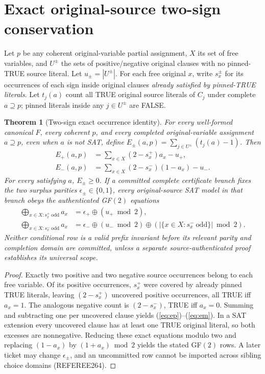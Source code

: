 \documentclass[11pt]{article}
\newtheorem{theorem}{Theorem}
\begin{document}
\section{Exact original-source two-sign conservation}
Let $p$ be any coherent original-variable partial assignment, $X$ its set of free variables, and $U^\pm$ the sets of positive/negative original clauses with no pinned-TRUE source literal. Let $u_\pm=|U^\pm|$. For each free original $x$, write $s_x^\pm$ for its occurrences of each sign inside original clauses \emph{already satisfied by pinned-TRUE literals}. Let $t_j(a)$ count all TRUE original source literals of $C_j$ under complete $a\supseteq p$; pinned literals inside any $j\in U^\pm$ are FALSE.
\begin{theorem}[Two-sign exact occurrence identity]\label{thm:split}
For every well-formed canonical $F$, every coherent $p$, and \emph{every} completed original-variable assignment $a\supseteq p$, even when $a$ is not SAT, define $E_\pm(a,p)=\sum_{j\in U^\pm}(t_j(a)-1)$. Then
\begin{align}
E_+(a,p)&=\sum_{x\in X}(2-s_x^+)a_x-u_+,\label{eq:ep}\\
E_-(a,p)&=\sum_{x\in X}(2-s_x^-)(1-a_x)-u_- .\label{eq:em}
\end{align}
For every satisfying $a$, $E_\pm\ge0$. If a \emph{committed} complete certificate branch fixes the two surplus parities $\epsilon_\pm\in\{0,1\}$, every original-source SAT model in that branch obeys the authenticated GF$(2)$ equations
\begin{align}
\bigoplus_{x\in X:s_x^+\ \mathrm{odd}}a_x&=\epsilon_+\oplus(u_+\bmod2),\\
\bigoplus_{x\in X:s_x^-\ \mathrm{odd}}a_x&=\epsilon_-\oplus(u_-\bmod2)\oplus(|\{x\in X:s_x^-\ \mathrm{odd}\}|\bmod2).
\end{align}
Neither conditional row is a valid prefix invariant before its relevant parity and completion domain are committed, unless a separate source-authenticated proof establishes its universal scope.
\end{theorem}
\begin{proof}
Exactly two positive and two negative source occurrences belong to each free variable. Of its positive occurrences, $s_x^+$ were covered by already pinned TRUE literals, leaving $(2-s_x^+)$ uncovered positive occurrences, all TRUE iff $a_x=1$. The analogous negative count is $(2-s_x^-)$, TRUE iff $a_x=0$. Summing and subtracting one per uncovered clause yields (\ref{eq:ep})--(\ref{eq:em}). In a SAT extension every uncovered clause has at least one TRUE original literal, so both excesses are nonnegative. Reducing these exact equations modulo two and replacing $(1-a_x)$ by $(1+a_x)\bmod2$ yields the stated GF$(2)$ rows. A later ticket may change $\epsilon_\pm$, and an uncommitted row cannot be imported across sibling choice domains (REFEREE264).
\end{proof}
\end{document}
